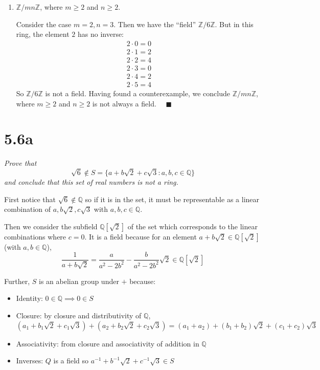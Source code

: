 \documentclass[12pt]{article}
\newcommand{\Z}{\mathbb{Z}}
\newcommand{\Q}{\mathbb{Q}}
\newcommand{\qed}{\quad \blacksquare}
\begin{document}
\begin{enumerate}
        \item $\Z/mn\Z$, where $m \geq 2$ and $n \geq 2.$
        
            \color{blue}
                Consider the case $m = 2, n = 3$. Then we have the ``field'' $\Z/6\Z$. But in this ring, the element $2$ has no inverse:
                    \begin{align*}
                        2 \cdot 0 = 0\\
                        2 \cdot 1 = 2\\
                        2 \cdot 2 = 4\\
                        2 \cdot 3 = 0\\
                        2 \cdot 4 = 2\\
                        2 \cdot 5 = 4
                    \end{align*}
                So $\Z/6\Z$ is not a field. Having found a counterexample, we conclude $\Z/mn\Z$, where $m \geq 2$ and $n \geq 2$ is not always a field. $\qed$
            \color{black}
    \end{enumerate}
\pagebreak

\section*{5.6a}
    \emph{Prove that}
    \[\sqrt 6 \not \in S = \{a + b \sqrt 2 + c\sqrt 3 : a, b, c \in \Q\}\] 
    \emph{and conclude that this set of real numbers is not a ring.}

        \color{blue}
            First notice that $\sqrt 6 \not \in \Q$ so if it is in the set, it must be representable as a linear combination of $a, b\sqrt 2, c\sqrt 3$ with $a, b, c \in \Q$. 

            Then we consider the subfield $\Q[\sqrt 2]$ of the set which corresponds to the linear combinations where $c = 0$. It is a field because for an element $a + b\sqrt 2 \in \Q[\sqrt 2]$ (with $a, b \in \Q$), 
                \[\frac{1}{a + b\sqrt 2} = \frac{a}{a^2 - 2b^2} - \frac{b}{a^2 - 2b^2}\sqrt 2 \in \Q[\sqrt 2]\]
            
            Further, $S$ is an abelian group under $+$ because:
            \begin{itemize}
                \item Identity: $0 \in \Q \implies 0 \in S$
                \item Closure: by closure and distributivity of $\Q$,
                \[(a_1 + b_1\sqrt 2 + c_1\sqrt 3) + (a_2 + b_2\sqrt 2 + c_2\sqrt 3) = (a_1 + a_2) + (b_1 + b_2)\sqrt 2 + (c_1 + c_2) \sqrt 3\]
                \item Associativity: from closure and associativity of addition in $\Q$
                \item Inverses: $Q$ is a field so $a^{-1} + b^{-1}\sqrt 2 + c^{-1}\sqrt 3 \in S$                
            \end{itemize}
\end{document}
